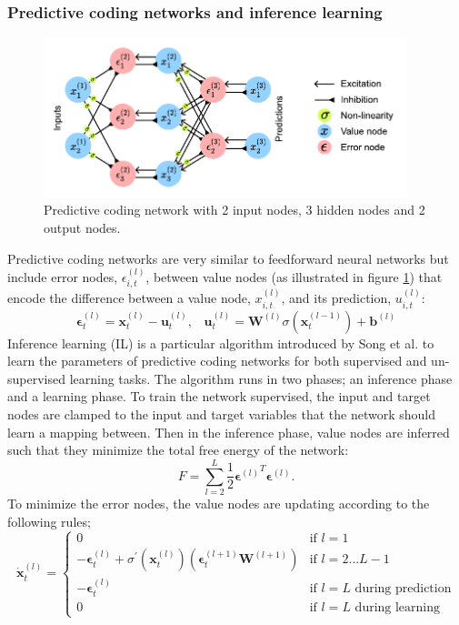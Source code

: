 \documentclass[a4paper,11pt]{article} %
\begin{document}
\subsubsection{Predictive coding networks and inference learning}
\begin{figure}
  \centering
  \includegraphics[width=300pt]{graphics/predictive-coding-network.pdf}
  \caption{Predictive coding network with 2 input nodes, 3 hidden nodes and 2 output nodes.}
  \label{fig:predictive-coding-network}
\end{figure}
Predictive coding networks are very similar to feedforward neural networks but include error nodes, $\epsilon_{i,t}^{(l)}$, between value nodes (as illustrated in figure \ref{fig:predictive-coding-network}) that encode the difference between a value node, $x_{i,t}^{(l)}$, and its prediction, $u_{i,t}^{(l)}$:
\begin{equation}
  \mathbf{\epsilon}_t^{(l)} = \mathbf{x}_t^{(l)} - \mathbf{u}_t^{(l)},\hspace{10pt}  \mathbf{u}_t^{(l)} = \mathbf{W}^{(l)} \sigma(\mathbf{x}_t^{(l-1)}) + \mathbf{b}^{(l)}
\end{equation}
 Inference learning (IL) is a particular algorithm introduced by Song et al. \cite{PredictiveCodingNetworks} to learn the parameters of predictive coding networks for both supervised and un-supervised learning tasks. The algorithm runs in two phases; an inference phase and a learning phase. To train the network supervised, the input and target nodes are clamped to the input and target variables that the network should learn a mapping between. Then in the inference phase, value nodes are inferred such that they minimize the total free energy of the network:
\begin{equation}
  F = \sum_{l=2}^{L}{
    \frac{1}{2}{\mathbf{\epsilon}^{(l)}}^T\mathbf{\epsilon}^{(l)}.
  }
\end{equation}
To minimize the error nodes, the value nodes are updating according to the following rules;
\begin{equation} \label{eq:update-value-nodes}
  \dot{\mathbf{x}}_t^{(l)} = \begin{cases}
    0 & \text{if } l=1 \\
     -\mathbf{\epsilon}_t^{(l)} + \sigma^\prime(\mathbf{x}_t^{(l)}) ( \mathbf{\epsilon}_t^{(l+1)} \mathbf{W}^{(l+1)} )  & \text{if } l = 2 \ldots L-1 \\
    - \mathbf{\epsilon}_t^{(l)} & \text {if } l = L \text{ during prediction} \\
    0 & \text {if } l = L \text{ during learning}
  \end{cases}
\end{equation}
\end{document}
